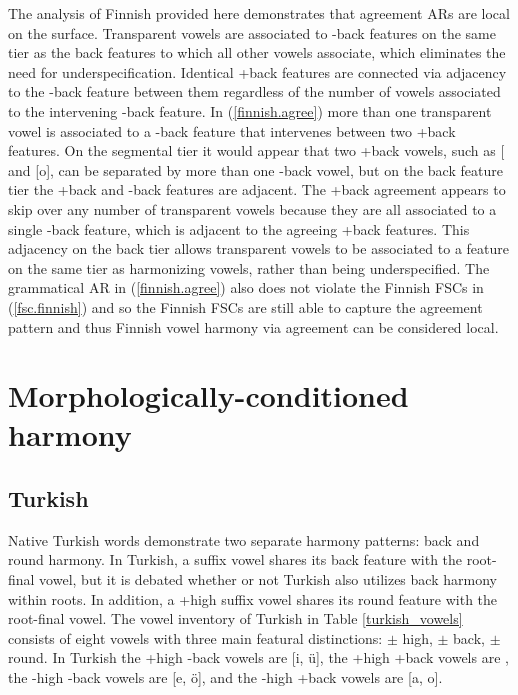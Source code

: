 \documentclass[,doc,floatsintext]{apa6}
\theoremstyle{definition}
\theoremstyle{definition}
\theoremstyle{definition}
\theoremstyle{remark}
\begin{document}
The analysis of Finnish provided here demonstrates that agreement ARs
are local on the surface. Transparent vowels are associated to -back
features on the same tier as the back features to which all other vowels
associate, which eliminates the need for underspecification. Identical
+back features are connected via adjacency to the -back feature between
them regardless of the number of vowels associated to the intervening
-back feature. In (\ref{finnish.agree}) more than one transparent vowel
is associated to a -back feature that intervenes between two +back
features. On the segmental tier it would appear that two +back vowels,
such as {[}\textipa{A}{]} and {[}o{]}, can be separated by more than one
-back vowel, but on the back feature tier the +back and -back features
are adjacent. The +back agreement appears to skip over any number of
transparent vowels because they are all associated to a single -back
feature, which is adjacent to the agreeing +back features. This
adjacency on the back tier allows transparent vowels to be associated to
a feature on the same tier as harmonizing vowels, rather than being
underspecified. The grammatical AR in (\ref{finnish.agree}) also does
not violate the Finnish FSCs in (\ref{fsc.finnish}) and so the Finnish
FSCs are still able to capture the agreement pattern and thus Finnish
vowel harmony via agreement can be considered local.

\section{Morphologically-conditioned
harmony}\label{morphologically-conditioned-harmony}

\subsection{Turkish}\label{turkish}

Native Turkish words demonstrate two separate harmony patterns: back and
round harmony. In Turkish, a suffix vowel shares its back feature with
the root-final vowel, but it is debated whether or not Turkish also
utilizes back harmony within roots. In addition, a +high suffix vowel
shares its round feature with the root-final vowel. The vowel inventory
of Turkish in Table \ref{turkish_vowels} consists of eight vowels with
three main featural distinctions: \(\pm\) high, \(\pm\) back, \(\pm\)
round. In Turkish the +high -back vowels are {[}i, ü{]}, the +high +back
vowels are \textipa{[1, u]}, the -high -back vowels are {[}e, ö{]}, and
the -high +back vowels are {[}a, o{]}.
\end{document}
